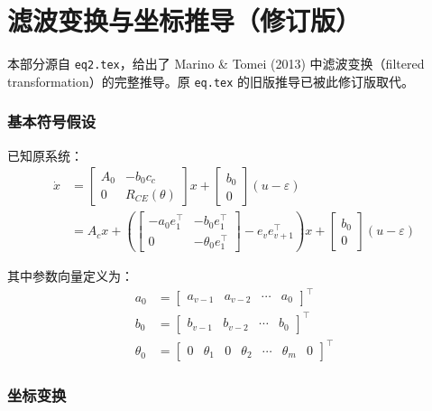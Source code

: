 \documentclass[12pt,a4paper]{article}
\begin{document}
\newpage
\part{滤波变换与坐标推导（修订版）}

本部分源自 \texttt{eq2.tex}，给出了 Marino \& Tomei (2013) 中滤波变换（filtered transformation）的完整推导。原 \texttt{eq.tex} 的旧版推导已被此修订版取代。

\section{基本符号假设}

已知原系统：
\begin{align*}
\dot{x} &=
\begin{bmatrix}
A_0 & -b_0c_c \\
0 & R_{CE}(\theta)
\end{bmatrix} x +
\begin{bmatrix}
b_0 \\ 0
\end{bmatrix} (u-\varepsilon) \\
&= A_c x +
\left(
\left[
\begin{array}{c|c}
-a_0e_1^\top & -b_0e_1^\top \\ \hline
0 & -\theta_0e_1^\top
\end{array}
\right]
- e_v e_{v+1}^\top
\right) x +
\begin{bmatrix}
b_0 \\ 0
\end{bmatrix} (u-\varepsilon)
\end{align*}

其中参数向量定义为：
\begin{align*}
a_0 &= \begin{bmatrix} a_{v-1} & a_{v-2} & \cdots & a_0 \end{bmatrix}^\top \\
b_0 &= \begin{bmatrix} b_{v-1} & b_{v-2} & \cdots & b_0 \end{bmatrix}^\top \\
\theta_0 &= \begin{bmatrix} 0 & \theta_1 & 0 & \theta_2 & \cdots & \theta_m & 0 \end{bmatrix}^\top
\end{align*}

\section{坐标变换}
\end{document}
